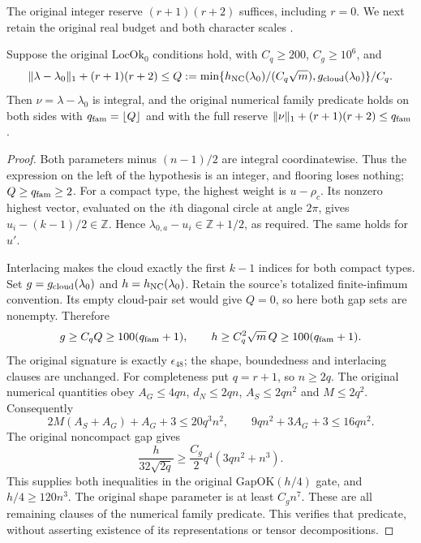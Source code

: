 The original integer reserve $(r+1)(r+2)$ suffices, including
$r=0$. We next retain the original real budget and both character
scales \cite{jacquet-gram-original}.

\begin{proposition}\label{jacquet-original-budget-transport}
Suppose the original $\mathrm{LocOk}_0$ conditions hold, with
$C_q\ge200$, $C_g\ge10^6$, and
\[
 \|\lambda-\lambda_0\|_1+(r+1)(r+2)
 \le Q:=\min\{h_{\rm NC}(\lambda_0)/(C_q\sqrt m),
                        g_{\rm cloud}(\lambda_0)\}/C_q .
\]
Then $\nu=\lambda-\lambda_0$ is integral, and the original
numerical family predicate holds on both sides with
$q_{\rm fam}=\lfloor Q\rfloor$ and with the full reserve
$\|\nu\|_1+(r+1)(r+2)\le q_{\rm fam}$.
\end{proposition}
\begin{proof}
Both parameters minus $(n-1)/2$ are integral coordinatewise.
Thus the expression on the left of the hypothesis is an integer,
and flooring loses nothing; $Q\ge q_{\rm fam}\ge2$.
For a compact type, the highest weight is $u-\rho_c$.
Its nonzero highest vector, evaluated on the $i$th diagonal
circle at angle $2\pi$, gives $u_i-(k-1)/2\in\mathbb Z$.
Hence $\lambda_{0,a}-u_i\in\mathbb Z+1/2$, as required.
The same holds for $u'$.

Interlacing makes the cloud exactly the first $k-1$ indices
for both compact types. Set $g=g_{\rm cloud}(\lambda_0)$
and $h=h_{\rm NC}(\lambda_0)$.
Retain the source's totalized finite-infimum convention.
Its empty cloud-pair set would give $Q=0$, so here both gap
sets are nonempty. Therefore
\[
 g\ge C_qQ\ge100(q_{\rm fam}+1),\qquad
 h\ge C_q^2\sqrt m\,Q\ge100(q_{\rm fam}+1).
\]
The original signature is exactly $\epsilon_{48}$; the
shape, boundedness and interlacing clauses are unchanged.
For completeness put $q=r+1$, so $n\ge2q$.
The original numerical quantities obey
$A_G\le4qn$, $d_N\le2qn$, $A_S\le2qn^2$ and $M\le2q^2$.
Consequently
\[
 2M(A_S+A_G)+A_G+3\le20q^3n^2,\qquad
 9qn^2+3A_G+3\le16qn^2.
\]
The original noncompact gap gives
\[
 \frac{h}{32\sqrt{2q}}
 \ge\frac{C_g}{2}q^4(3qn^2+n^3).
\]
This supplies both inequalities in the original
$\mathrm{GapOK}(h/4)$ gate, and $h/4\ge120n^3$.
The original shape parameter is at least $C_gn^7$.
These are all remaining clauses of the numerical family predicate.
This verifies that predicate, without asserting existence of
its representations or tensor decompositions.
\end{proof}

